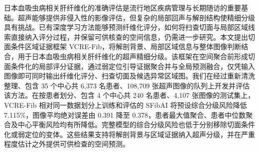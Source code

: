 日本血吸虫病相关肝纤维化的准确评估是流行地区疾病管理与长期随访的重要基础。超声能够提供非侵入性的影像评估，但复杂的局部回声与解剖结构使精细分级具有挑战。已有深度学习方法能够预测纤维化评分，如何将扫查切面与局部区域线索直接纳入评分过程，并保留可供核查的空间信息，仍需进一步研究。本文提出切面条件区域证据框架 VCRE-Fib，将解剖背景、局部区域信息与整体图像判断结合，用于日本血吸虫病相关肝纤维化的超声精细分级。该框架在空间聚合前形成切面条件化的局部评分证据，通过弱定位引导证据聚合并与全局预测融合，仅凭输入图像即可同时输出纤维化评分、扫查切面及候选异常区域图。我们在经过重新清洗整理、包含 35 个中心共 6,373 名患者、108,709 张超声图像的队列上开发并评估该方法。在按患者划分、包含 4 个中心共 240 名患者、4,107 张图像的测试集上，VCRE-Fib 相对同一数据划分上训练和评估的 SFibAI 将预设综合分级风险降低 7.115\%，图像平均绝对误差由 0.391 降至 0.378，患者最大值聚合、患者中位数聚合及中心平衡风险均有所降低。完整模型的综合分级风险也低于分别移除切面条件化或弱定位的变体。这些结果支持将解剖背景与区域证据纳入超声分级，并在严重程度估计之外提供可供检查的空间预测。
